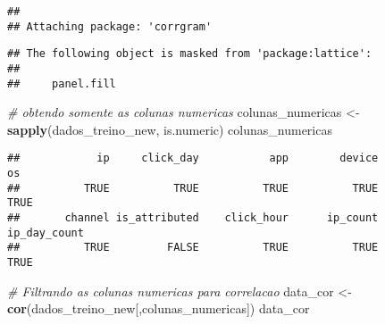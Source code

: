 \documentclass[]{article}
\newenvironment{Shaded}{\begin{snugshade}}{\end{snugshade}}
\newcommand{\CommentTok}[1]{\textcolor[rgb]{0.56,0.35,0.01}{\textit{#1}}}
\newcommand{\KeywordTok}[1]{\textcolor[rgb]{0.13,0.29,0.53}{\textbf{#1}}}
\newcommand{\NormalTok}[1]{#1}
\newcommand{\StringTok}[1]{\textcolor[rgb]{0.31,0.60,0.02}{#1}}
\begin{document}
\begin{verbatim}
## 
## Attaching package: 'corrgram'
\end{verbatim}

\begin{verbatim}
## The following object is masked from 'package:lattice':
## 
##     panel.fill
\end{verbatim}

\begin{Shaded}
\begin{Highlighting}[]
\CommentTok{# obtendo somente as colunas numericas}
\NormalTok{colunas_numericas <-}\StringTok{ }\KeywordTok{sapply}\NormalTok{(dados_treino_new, is.numeric)}
\NormalTok{colunas_numericas}
\end{Highlighting}
\end{Shaded}

\begin{verbatim}
##            ip     click_day           app        device            os 
##          TRUE          TRUE          TRUE          TRUE          TRUE 
##       channel is_attributed    click_hour      ip_count  ip_day_count 
##          TRUE         FALSE          TRUE          TRUE          TRUE
\end{verbatim}

\begin{Shaded}
\begin{Highlighting}[]
\CommentTok{# Filtrando as colunas numericas para correlacao}
\NormalTok{data_cor <-}\StringTok{ }\KeywordTok{cor}\NormalTok{(dados_treino_new[,colunas_numericas])}
\NormalTok{data_cor}
\end{Highlighting}
\end{Shaded}
\end{document}
